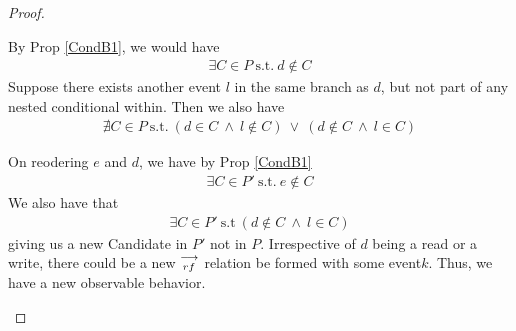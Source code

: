\begin{proof}
\begin{itemize}
                    By Prop \ref{CondB1}, we would have 
                    \begin{align*}
                        \exists C \in P \ \text{s.t.} \ d \notin C  
                    \end{align*}
                    Suppose there exists another event $l$ in the same branch as $d$, but not part of any nested conditional within. Then we also have 
                    \begin{align*}
                        \nexists C \in P \ \text{s.t.} \ 
                        (d \in C \ \wedge \ l \notin C) 
                        \ \vee \ 
                        (d \notin C \ \wedge \ l \in C)   
                    \end{align*}


                    On reodering $e$ and $d$, we have by Prop \ref{CondB1}
                    \begin{align*}
                        \exists C \in P' \ \text{s.t.} \ e \notin C  
                    \end{align*}
                    We also have that 
                    \begin{align*}
                        \exists C \in P' \ \text{s.t} \ (d \notin C \ \wedge \ l \in C) 
                    \end{align*}
                    giving us a new Candidate in $P'$ not in $P$.
                    Irrespective of $d$ being a read or a write, there could be a new $\stackrel{\longrightarrow}{_{rf}}$ relation be formed with some event$k$. Thus, we have a new observable behavior. 


\end{itemize}
\end{proof}
